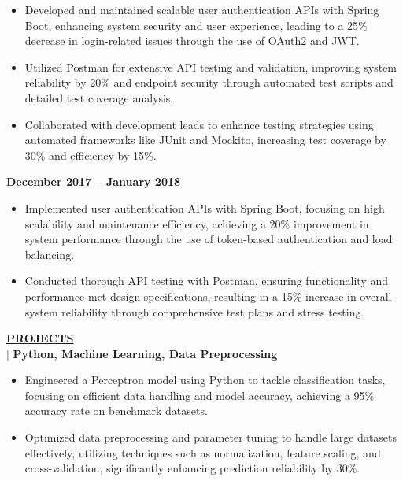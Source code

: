 \documentclass{article}
\begin{document}
\begin{itemize}[noitemsep,nolistsep,leftmargin=*]
    \item Developed and maintained scalable user authentication APIs with Spring Boot, enhancing system security and user experience, leading to a 25\% decrease in login-related issues through the use of OAuth2 and JWT. 
    \item Utilized Postman for extensive API testing and validation, improving system reliability by 20\% and endpoint security through automated test scripts and detailed test coverage analysis. 
    \item Collaborated with development leads to enhance testing strategies using automated frameworks like JUnit and Mockito, increasing test coverage by 30\% and efficiency by 15\%. 
\end{itemize}
\vspace{1mm}
 \hfill \textbf{December 2017 – January 2018}
\begin{itemize}[noitemsep,nolistsep,leftmargin=*]
    \item Implemented user authentication APIs with Spring Boot, focusing on high scalability and maintenance efficiency, achieving a 20\% improvement in system performance through the use of token-based authentication and load balancing. 
    \item Conducted thorough API testing with Postman, ensuring functionality and performance met design specifications, resulting in a 15\% increase in overall system reliability through comprehensive test plans and stress testing.
\end{itemize}





\vspace{2mm}
\noindent \textbf{\underline{PROJECTS}}\\
 $\mid$ \textbf{Python, Machine Learning, Data Preprocessing} \hfill 
\begin{itemize}[noitemsep,nolistsep,leftmargin=*]
    \item Engineered a Perceptron model using Python to tackle classification tasks, focusing on efficient data handling and model accuracy, achieving a 95\% accuracy rate on benchmark datasets.
    \item Optimized data preprocessing and parameter tuning to handle large datasets effectively, utilizing techniques such as normalization, feature scaling, and cross-validation, significantly enhancing prediction reliability by 30\%. 
\end{itemize}
\end{document}
